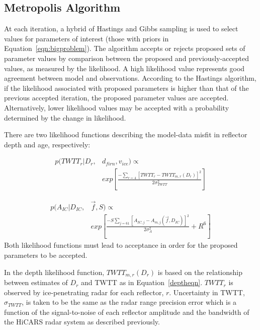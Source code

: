 \subsection{Metropolis Algorithm}\label{metrop}
At each iteration, a hybrid of Hastings and Gibbs sampling \citep{hastings1970,gelfand1992} is used to select values for parameters of interest (those with priors in Equation~\ref{eqn:bigproblem}). The algorithm accepts or rejects proposed sets of parameter values by comparison between the proposed and previously-accepted values, as measured by the likelihood. A high likelihood value represents good agreement between model and observations. According to the Hastings algorithm, if the likelihood associated with proposed parameters is higher than that of the previous accepted iteration, the proposed parameter values are accepted. Alternatively, lower likelihood values may be accepted with a probability determined by the change in likelihood.


There are two likelihood functions describing the model-data misfit in reflector depth and age, respectively:

\begin{equation}\label{eqn:loglikedepth}
\begin{split}
p(TWTT_r | D_r,& d_{firn},v_{ice} ) \propto  \\
& exp[\frac{-\sum_{r=4}[TWTT_{r} - TWTT_{m,r}(D_r)]^2}{2\sigma_{TWTT}^2}]
\end{split}
\end{equation}

\begin{equation}\label{eqn:loglikeage}
\begin{split}
p(A_{IC} | D_{IC},&\vec{f},S) \propto \\
& exp[\frac{-S\sum_{j = 61}[A_{IC,j} - A_{m,j}(\vec{f},D_{IC})]^2}{2\sigma_A^2} + R^6]
\end{split}
\end{equation}
Both likelihood functions must lead to acceptance in order for the proposed parameters to be accepted.

In the depth likelihood function, $TWTT_{m,r}(D_r)$ is based on the relationship between estimates of $D_r$ and TWTT as in Equation~\ref{deptheqn}. $TWTT_r$ is observed by ice-penetrating radar for each reflector, $r$. Uncertainty in TWTT, $\sigma_{TWTT}$, is taken to be the same as the radar range precision error which is a function of the signal-to-noise of each reflector amplitude and the bandwidth of the HiCARS radar system as described previously.

